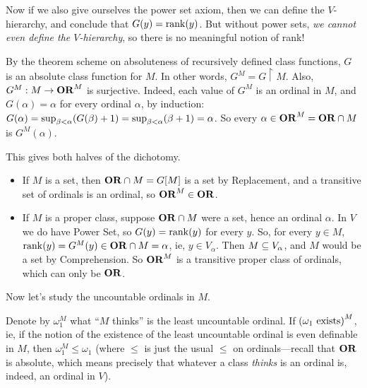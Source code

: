 Now if we also give ourselves the power set axiom, then we can define the $V$-hierarchy, and conclude that $G(y) = \operatorname{rank}\!\left( y \right)$. But without power sets, \textit{we cannot even define the $V$-hierarchy}, so there is no meaningful notion of rank!

By the theorem scheme on absoluteness of recursively defined class functions, $G$ is an absolute class function for $M$. In other words, $G^M = G \restriction M$. Also, $G^M : M \to \mathbf{OR}^M$ is surjective. %
Indeed, each value of $G^M$ is an ordinal in $M$, and $G(\alpha) = \alpha$ for every ordinal $\alpha$, by induction: $G(\alpha) = \sup_{\beta < \alpha}\!\left( G(\beta) + 1 \right) = \sup_{\beta < \alpha}\!\left( \beta + 1 \right) = \alpha$. So every $\alpha \in \mathbf{OR}^M = \mathbf{OR} \cap M$ is $G^M(\alpha)$.

This gives both halves of the dichotomy.
\begin{itemize}
    \item If $M$ is a set, then $\mathbf{OR} \cap M = G[M]$ is a set by Replacement, and a transitive set of ordinals is an ordinal, so $\mathbf{OR}^M \in \mathbf{OR}$.
    \item If $M$ is a proper class, suppose $\mathbf{OR} \cap M$ were a set, hence an ordinal $\alpha$. In $V$ we do have Power Set, so $G(y) = \operatorname{rank}\!\left( y \right)$ for every $y$. So, for every $y \in M$, $\operatorname{rank}\!\left( y \right) = G^M(y) \in \mathbf{OR} \cap M = \alpha$, ie, $y \in V_{\alpha}$. Then $M \subseteq V_{\alpha}$, and $M$ would be a set by Comprehension. So $\mathbf{OR}^M$ is a transitive proper class of ordinals, which can only be $\mathbf{OR}$.
\end{itemize}

Now let's study the uncountable ordinals in $M$.

Denote by $\omega_1^M$ what ``$M$ thinks'' is the least uncountable ordinal. If $\left( \omega_1 \text{ exists} \right)^M$, ie, if the notion of the existence of the least uncountable ordinal is even definable in $M$, then $\omega_1^M \leq \omega_1$ (where $\le$ is just the usual $\le$ on ordinals---recall that $\mathbf{OR}$ is absolute, which means precisely that whatever a class \textit{thinks} is an ordinal is, indeed, an ordinal in $V$).
